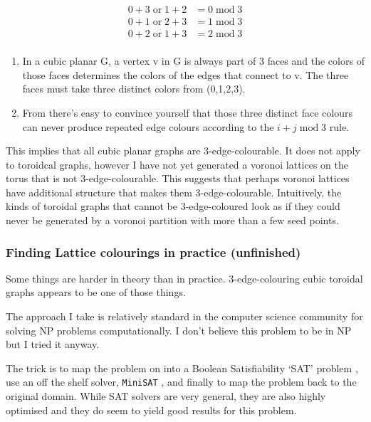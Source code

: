 \[\begin{aligned}
0 + 3 \;\mathrm{or}\; 1 + 2 &= 0 \;\mathrm{mod}\; 3\\ 
0 + 1 \;\mathrm{or}\; 2 + 3 &= 1 \;\mathrm{mod}\; 3\\
0 + 2 \;\mathrm{or}\;1 + 3 &= 2 \;\mathrm{mod}\; 3\\
\end{aligned}
\]

\begin{enumerate}
\def\labelenumi{\arabic{enumi}.}
\setcounter{enumi}{2}
\tightlist
\item
  In a cubic planar G, a vertex v in G is always part of 3 faces and the
  colors of those faces determines the colors of the edges that connect
  to v. The three faces must take three distinct colors from (0,1,2,3).
\item
  From there's easy to convince yourself that those three distinct face
  colours can never produce repeated edge colours according to the
  \(i+j \;\mathrm{mod}\; 3\) rule.
\end{enumerate}

This implies that all cubic planar graphs are 3-edge-colourable. It does
not apply to toroidcal graphs, however I have not yet generated a
voronoi lattices on the torus that is not 3-edge-colourable. This
suggests that perhaps voronoi lattices have additional structure that
makes them 3-edge-colourable. Intuitively, the kinds of toroidal graphs
that cannot be 3-edge-coloured look as if they could never be generated
by a voronoi partition with more than a few seed points.

\hypertarget{finding-lattice-colourings-in-practice-unfinished}{%
\subsubsection{Finding Lattice colourings in practice
(unfinished)}\label{finding-lattice-colourings-in-practice-unfinished}}

Some things are harder in theory than in practice. 3-edge-colouring
cubic toroidal graphs appears to be one of those things.

The approach I take is relatively standard in the computer science
community for solving NP problems computationally. I don't believe this
problem to be in NP but I tried it anyway.

The trick is to map the problem on into a Boolean Satisfiability `SAT'
problem \autocite{Karp1972}, use an off the shelf solver,
\texttt{MiniSAT} \autocite{imms-sat18}, and finally to map the problem
back to the original domain. While SAT solvers are very general, they
are also highly optimised and they do seem to yield good results for
this problem.

